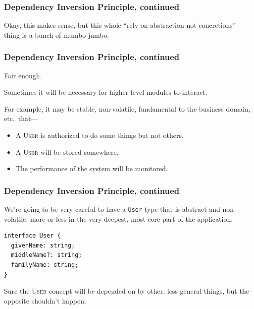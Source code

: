\documentclass[aspectratio=169]{beamer}
\begin{document}
\begin{frame}
  \frametitle{Dependency Inversion Principle, continued}
  Okay, this makes sense, but this whole ``rely on abstraction not concretions''
  thing is a bunch of mumbo-jumbo.
\end{frame}

\begin{frame}
  \frametitle{Dependency Inversion Principle, continued}
  Fair enough.

  \vspace{1em}

  Sometimes it will be necessary for higher-level modules to interact.

  \vspace{1em}

  For example, it may be stable, non-volatile, fundamental to the business
  domain, etc.\ that---

  \begin{itemize}
    \item A \textsc{User} is authorized to do some things but not
          others.
    \item A \textsc{User} will be stored somewhere.
    \item The performance of the system will be monitored.
  \end{itemize}
\end{frame}

\begin{frame}[fragile]
  \frametitle{Dependency Inversion Principle, continued}
  We're going to be very careful to have a \texttt{User} type that is abstract
  and non-volatile, more or less in the very deepest, most core part of the
  application:

  \vspace{1em}

  \begin{verbatim}
interface User {
  givenName: string;
  middleName?: string;
  familyName: string;
}
  \end{verbatim}

  \vspace{1em}

  Sure the \textsc{User} concept will be depended on by other, less general
  things, but the opposite shouldn't happen.
\end{frame}
\end{document}
